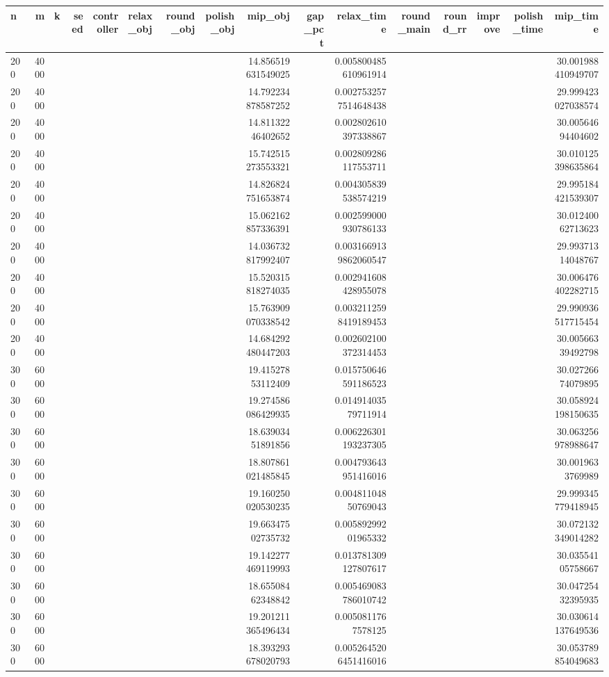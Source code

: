 \begin{tabular}{lrrrrlrrrrrrrrrr}
\hline
n & m & k & seed & controller & relax_obj & round_obj & polish_obj & mip_obj & gap_pct & relax_time & round_main & round_rr & improve & polish_time & mip_time \\ \hline
200 & 4000 &  &  &  &  &  &  & 14.856519631549025 &  & 0.005800485610961914 &  &  &  &  & 30.001988410949707 \\
200 & 4000 &  &  &  &  &  &  & 14.792234878587252 &  & 0.0027532577514648438 &  &  &  &  & 29.999423027038574 \\
200 & 4000 &  &  &  &  &  &  & 14.81132246402652 &  & 0.002802610397338867 &  &  &  &  & 30.00564694404602 \\
200 & 4000 &  &  &  &  &  &  & 15.742515273553321 &  & 0.002809286117553711 &  &  &  &  & 30.010125398635864 \\
200 & 4000 &  &  &  &  &  &  & 14.826824751653874 &  & 0.004305839538574219 &  &  &  &  & 29.995184421539307 \\
200 & 4000 &  &  &  &  &  &  & 15.062162857336391 &  & 0.002599000930786133 &  &  &  &  & 30.01240062713623 \\
200 & 4000 &  &  &  &  &  &  & 14.036732817992407 &  & 0.0031669139862060547 &  &  &  &  & 29.99371314048767 \\
200 & 4000 &  &  &  &  &  &  & 15.520315818274035 &  & 0.002941608428955078 &  &  &  &  & 30.006476402282715 \\
200 & 4000 &  &  &  &  &  &  & 15.763909070338542 &  & 0.0032112598419189453 &  &  &  &  & 29.990936517715454 \\
200 & 4000 &  &  &  &  &  &  & 14.684292480447203 &  & 0.002602100372314453 &  &  &  &  & 30.00566339492798 \\
300 & 6000 &  &  &  &  &  &  & 19.41527853112409 &  & 0.015750646591186523 &  &  &  &  & 30.02726674079895 \\
300 & 6000 &  &  &  &  &  &  & 19.274586086429935 &  & 0.01491403579711914 &  &  &  &  & 30.058924198150635 \\
300 & 6000 &  &  &  &  &  &  & 18.63903451891856 &  & 0.006226301193237305 &  &  &  &  & 30.063256978988647 \\
300 & 6000 &  &  &  &  &  &  & 18.807861021485845 &  & 0.004793643951416016 &  &  &  &  & 30.0019633769989 \\
300 & 6000 &  &  &  &  &  &  & 19.160250020530235 &  & 0.00481104850769043 &  &  &  &  & 29.999345779418945 \\
300 & 6000 &  &  &  &  &  &  & 19.66347502735732 &  & 0.00589299201965332 &  &  &  &  & 30.072132349014282 \\
300 & 6000 &  &  &  &  &  &  & 19.142277469119993 &  & 0.013781309127807617 &  &  &  &  & 30.03554105758667 \\
300 & 6000 &  &  &  &  &  &  & 18.65508462348842 &  & 0.005469083786010742 &  &  &  &  & 30.04725432395935 \\
300 & 6000 &  &  &  &  &  &  & 19.201211365496434 &  & 0.0050811767578125 &  &  &  &  & 30.030614137649536 \\
300 & 6000 &  &  &  &  &  &  & 18.393293678020793 &  & 0.0052645206451416016 &  &  &  &  & 30.053789854049683 \\
\hline
\end{tabular}
